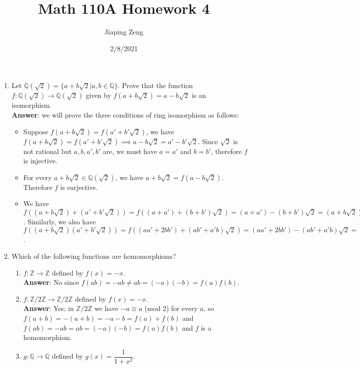 \documentclass{article}
\title{Math 110A Homework 4}
\date{2/8/2021}
\author{Jiaping Zeng}
\begin{document}
\maketitle

\begin{enumerate}
      \item Let $\mathbb{Q}(\sqrt 2) = \{a+b\sqrt{2}|a,b\in\mathbb{Q}\}$. Prove that the function $f:\mathbb{Q}(\sqrt 2)\to \mathbb{Q}(\sqrt 2)$ given by $f(a+b\sqrt 2) = a-b\sqrt 2$ is an isomorphism.\\
            \textbf{Answer}: we will prove the three conditions of ring isomorphism as follows:
            \begin{itemize}
                  \item [(i)] Suppose $f(a+b\sqrt{2})=f(a'+b'\sqrt{2})$, we have $f(a+b\sqrt{2})=f(a'+b'\sqrt{2})\implies a-b\sqrt{2}=a'-b'\sqrt{2}$. Since $\sqrt{2}$ is not rational but $a,b,a',b'$ are, we must have $a=a'$ and $b=b'$, therefore $f$ is injective.
                  \item [(ii)] For every $a+b\sqrt{2}\in\mathbb{Q}(\sqrt{2})$, we have $a+b\sqrt{2}=f(a-b\sqrt{2})$. Therefore $f$ is surjective.
                  \item [(iii)] We have $f((a+b\sqrt{2})+(a'+b'\sqrt{2}))=f((a+a')+(b+b')\sqrt{2})=(a+a')-(b+b')\sqrt{2}=(a+b\sqrt{2})+(a'+b'\sqrt{2})=f(a+b\sqrt{2})+f(a'+b'\sqrt{2})$. Similarly, we also have $f((a+b\sqrt{2})(a'+b'\sqrt{2}))=f((aa'+2bb')+(ab'+a'b)\sqrt{2})=(aa'+2bb')-(ab'+a'b)\sqrt{2}=(a-b\sqrt{2})(a'-b'\sqrt{2})=f(a+b\sqrt{2})f(a'+b'\sqrt{2})$.
            \end{itemize}
      \item Which of the following functions are homomorphisms?
            \begin{enumerate}
                  \item $f:\mathbb{Z}\rightarrow\mathbb{Z}$ defined by $f(x)=-x$.\\
                        \textbf{Answer}: No since $f(ab)=-ab\neq ab=(-a)(-b)=f(a)f(b)$.
                  \item $f:\mathbb{Z}/2\mathbb{Z}\rightarrow\mathbb{Z}/2\mathbb{Z}$ defined by $f(x)=-x$.\\
                        \textbf{Answer}: Yes; in $\mathbb{Z}/2\mathbb{Z}$ we have $-a\equiv a$ (mod 2) for every $a$, so $f(a+b)=-(a+b)=-a-b=f(a)+f(b)$ and $f(ab)=-ab=ab=(-a)(-b)=f(a)f(b)$ and $f$ is a homomorphism.
                  \item $g:\mathbb{Q}\rightarrow\mathbb{Q}$ defined by $g(x)=\dfrac{1}{1+x^2}$.\\

\end{enumerate}
\end{enumerate}
\end{document}
